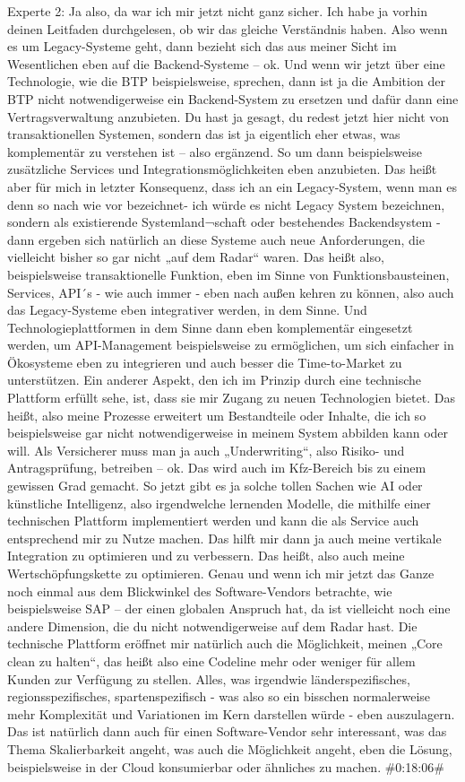 Experte 2:
Ja also, da war ich mir jetzt nicht ganz sicher. Ich habe ja vorhin deinen Leitfaden durchgelesen, ob wir das gleiche Verständnis haben. Also wenn es um Legacy-Systeme geht, dann bezieht sich das aus meiner Sicht im Wesentlichen eben auf die Backend-Systeme – ok. Und wenn wir jetzt über eine Technologie, wie die BTP beispielsweise, sprechen, dann ist ja die Ambition der BTP nicht notwendigerweise ein Backend-System zu ersetzen und dafür dann eine Vertragsverwaltung anzubieten. Du hast ja gesagt, du redest jetzt hier nicht von transaktionellen Systemen, sondern das ist ja eigentlich eher etwas, was komplementär zu verstehen ist – also ergänzend. So um dann beispielsweise zusätzliche Services und Integrationsmöglichkeiten eben anzubieten. Das heißt aber für mich in letzter Konsequenz, dass ich an ein Legacy-System, wenn man es denn so nach wie vor bezeichnet- ich würde es nicht Legacy System bezeichnen, sondern als existierende Systemland¬schaft oder bestehendes Backendsystem - dann ergeben sich natürlich an diese Systeme auch neue Anforderungen, die vielleicht bisher so gar nicht „auf dem Radar“ waren. Das heißt also, beispielsweise transaktionelle Funktion, eben im Sinne von Funktionsbausteinen, Services, API´s - wie auch immer - eben nach außen kehren zu können, also auch das Legacy-Systeme eben integrativer werden, in dem Sinne. Und Technologieplattformen in dem Sinne dann eben komplementär eingesetzt werden, um API-Management beispielsweise zu ermöglichen, um sich einfacher in Ökosysteme eben zu integrieren und auch besser die Time-to-Market zu unterstützen. Ein anderer Aspekt, den ich im Prinzip durch eine technische Plattform erfüllt sehe, ist, dass sie mir Zugang zu neuen Technologien bietet. Das heißt, also meine Prozesse erweitert um Bestandteile oder Inhalte, die ich so beispielsweise gar nicht notwendigerweise in meinem System abbilden kann oder will. Als Versicherer muss man ja auch „Underwriting“, also Risiko- und Antragsprüfung, betreiben – ok. Das wird auch im Kfz-Bereich bis zu einem gewissen Grad gemacht. So jetzt gibt es ja solche tollen Sachen wie AI oder künstliche Intelligenz, also irgendwelche lernenden Modelle, die mithilfe einer technischen Plattform implementiert werden und kann die als Service auch entsprechend mir zu Nutze machen. Das hilft mir dann ja auch meine vertikale Integration zu optimieren und zu verbessern. Das heißt, also auch meine Wertschöpfungskette zu optimieren. Genau und wenn ich mir jetzt das Ganze noch einmal aus dem Blickwinkel des Software-Vendors betrachte, wie beispielsweise SAP – der einen globalen Anspruch hat, da ist vielleicht noch eine andere Dimension, die du nicht notwendigerweise auf dem Radar hast. Die technische Plattform eröffnet mir natürlich auch die Möglichkeit, meinen „Core clean zu halten“, das heißt also eine Codeline mehr oder weniger für allem Kunden zur Verfügung zu stellen. Alles, was irgendwie länderspezifisches, regionsspezifisches, spartenspezifisch - was also so ein bisschen normalerweise mehr Komplexität und Variationen im Kern darstellen würde - eben auszulagern. Das ist natürlich dann auch für einen Software-Vendor sehr interessant, was das Thema Skalierbarkeit angeht, was auch die Möglichkeit angeht, eben die Lösung, beispielsweise in der Cloud konsumierbar oder ähnliches zu machen.
\#0:18:06\#

